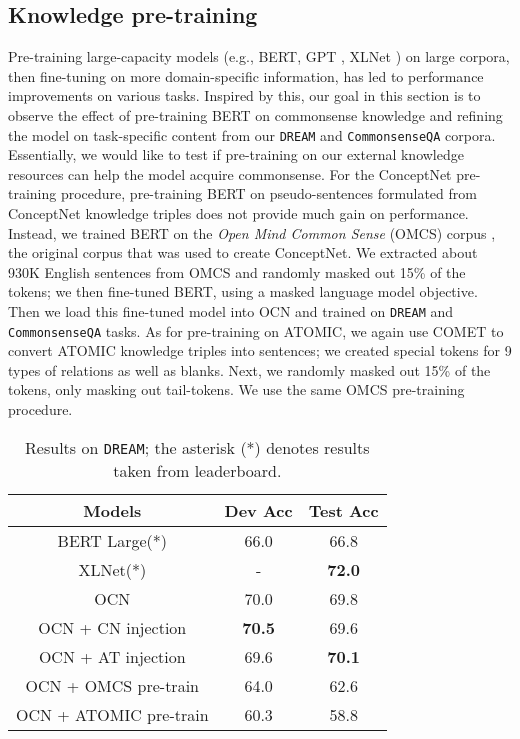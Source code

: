 \documentclass[11pt,a4paper]{article}
\begin{document}
\subsection{Knowledge pre-training}
Pre-training large-capacity models (e.g., BERT, GPT \cite{radford2019language}, XLNet \cite{yang2019xlnet}) on large corpora, then fine-tuning on more domain-specific information, has led to performance improvements on various tasks. Inspired by this, our goal in this section is to observe the effect of pre-training BERT on commonsense knowledge and refining the model on task-specific content from our \texttt{DREAM} and \texttt{CommonsenseQA} corpora. Essentially, we would like to test if pre-training on our external knowledge resources can help the model acquire commonsense. For the ConceptNet pre-training procedure, pre-training BERT on pseudo-sentences formulated from ConceptNet knowledge triples does not provide much gain on performance. Instead, we trained BERT on the \textit{Open Mind Common Sense} (OMCS) corpus \cite{Singh:2002:OMC:646748.701499}, the original corpus that was used to create ConceptNet. We extracted about 930K English sentences from OMCS and randomly masked out 15\% of the tokens; we then fine-tuned BERT, using a masked language model objective. Then we load this fine-tuned model into OCN and trained on \texttt{DREAM} and \texttt{CommonsenseQA} tasks.  
As for pre-training on ATOMIC, we again use COMET to convert ATOMIC knowledge triples into sentences; we created special tokens for 9 types of relations as well as blanks. Next, we randomly masked out 15\% of the tokens, only masking out tail-tokens. We use the same OMCS pre-training procedure. 
\begin{table}[h]
\footnotesize
\begin{center}
\begin{tabular}{|c|cc|}
\hline \bf Models & \bf Dev Acc & \bf Test Acc \\ \hline
BERT Large(*) & 66.0 & 66.8 \\ 
XLNet(*) & - & \bf 72.0 \\ \hline
OCN & 70.0 & 69.8 \\
OCN + CN injection & \bf 70.5 & 69.6 \\
OCN + AT injection & 69.6 & \bf 70.1 \\
OCN + OMCS pre-train & 64.0 & 62.6 \\
OCN + ATOMIC pre-train & 60.3 & 58.8 \\
\hline
\end{tabular}
\end{center}
\caption{Results on \texttt{DREAM}; the asterisk (*) denotes results taken from leaderboard.}
\label{dream-results}
\end{table}
\end{document}
